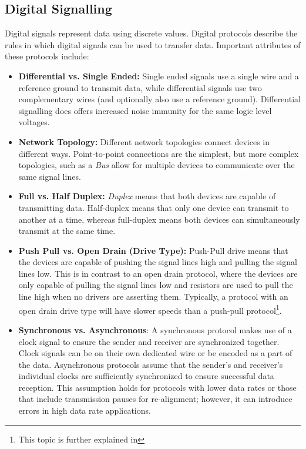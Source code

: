 \documentclass[main.tex]{subfiles}
\begin{document}
\subsection{Digital Signalling}
Digital signals represent data using discrete values. Digital protocols describe the rules in which digital signals can be used to transfer data. Important attributes of these protocols include:
\begin{itemize}
    \item \textbf{Differential vs. Single Ended:} Single ended signals use a single wire and a reference ground to transmit data, while differential signals use two complementary wires (and optionally also use a reference ground). Differential signalling does offers increased noise immunity for the same logic level voltages.
    \item \textbf{Network Topology:} Different network topologies connect devices in different ways. Point-to-point connections are the simplest, but more complex topologies, such as a \textit{Bus} allow for multiple devices to communicate over the same signal lines.
    \item \textbf{Full vs. Half Duplex:} \textit{Duplex} means that both devices are capable of transmitting data. Half-duplex means that only one device can transmit to another at a time, whereas full-duplex means both devices can simultaneously transmit at the same time. 
    \item \textbf{Push Pull vs. Open Drain (Drive Type):} Push-Pull drive means that the devices are capable of pushing the signal lines high and pulling the signal lines low. This is in contrast to an open drain protocol, where the devices are only capable of pulling the signal lines low and resistors are used to pull the line high when no drivers are asserting them. Typically, a protocol with an open drain drive type will have slower speeds than a push-pull protocol\footnote{This topic is further explained in }.
    \item \textbf{Synchronous vs. Asynchronous}: A synchronous protocol makes use of a clock signal to ensure the sender and receiver are synchronized together. Clock signals can be on their own dedicated wire or be encoded as a part of the data. Asynchronous protocols assume that the sender's and receiver's individual clocks are sufficiently synchronized to ensure successful data reception. This assumption holds for protocols with lower data rates or those that include transmission pauses for re-alignment; however, it can introduce errors in high data rate applications.
\end{itemize}
\end{document}
